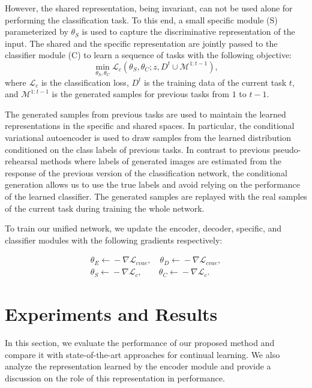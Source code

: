 \documentclass[letterpaper]{article} %
\begin{document}
However, the shared representation, being invariant, can not be used alone for performing the classification task. To this end, a small specific module (S) parameterized by $\theta_{S}$ is used to capture the discriminative representation of the input. The shared and the specific representation are jointly passed to the classifier module (C) to learn a sequence of tasks with the following objective:
\begin{equation}
\min_{\theta_{S},\theta_{C}} \mathcal{L}_{c} (\theta_{S},\theta_{C};z, D^{t} \cup \mathcal{M}^{1:t-1}),
\label{classification_loss}
\end{equation}
where $\mathcal{L}_{c}$ is the classification loss, $D^{t}$ is the training data of the current task $t$, and $\mathcal{M}^{1:t-1}$ is the generated samples for previous tasks from $1$ to $t-1$.

The generated samples from previous tasks are used to maintain the learned representations in the specific and shared spaces. In particular, the conditional variational autoencoder is used to draw samples from the learned distribution conditioned on the class labels of previous tasks. In contrast to previous pseudo-rehearsal methods where labels of generated images are estimated from the response of the previous version of the classification network, the conditional generation allows us to use the true labels and avoid relying on the performance of the learned classifier. The generated samples are replayed with the real samples of the current task during training the whole network.

To train our unified network, we update the encoder, decoder, specific, and classifier modules with the following gradients respectively:

\begin{equation}
\label{gradient}
\begin{split}
\theta_{E} \xleftarrow{} - \nabla \mathcal{L}_{cvae}, \quad
\theta_{D} \xleftarrow{} - \nabla \mathcal{L}_{cvae},\\
\theta_{S} \xleftarrow{} - \nabla \mathcal{L}_{c}, \quad \quad
\theta_{C} \xleftarrow{} - \nabla \mathcal{L}_{c}.
\end{split}
\end{equation}


\section{Experiments and Results}
In this section, we evaluate the performance of our proposed method and compare it with state-of-the-art approaches for continual learning. We also analyze the representation learned by the encoder module and provide a discussion on the role of this representation in performance.
\end{document}
